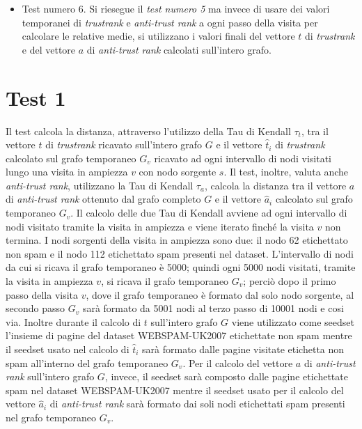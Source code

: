 \begin{itemize}
 \item Test numero 6. Si riesegue il \textit{test numero 5} ma invece di usare dei valori temporanei di \textit{trustrank} e \textit{anti-trust rank} a ogni passo della visita per calcolare le relative medie, si utilizzano i valori finali del vettore \(t\) di \textit{trustrank} e del vettore  \(a\) di \textit{anti-trust rank} calcolati sull'intero grafo.
 \end{itemize}
 
\section{Test 1}
 Il test calcola la distanza, attraverso l'utilizzo  della Tau di Kendall \(\tau_t\), tra il vettore \(t\) di \textit{trustrank} ricavato sull'intero grafo \(G\) e il vettore \(\hat{t}_i\) di \textit{trustrank} calcolato sul grafo temporaneo \(G_v\) ricavato ad ogni intervallo di nodi visitati lungo una visita in ampiezza \(v\) con nodo sorgente \(s\). Il test, inoltre, valuta anche \textit{anti-trust rank}, utilizzano  la Tau di Kendall \(\tau_a\), calcola la distanza  tra il vettore \(a\) di \textit{anti-trust rank} ottenuto dal grafo completo \(G\) e il vettore \(\hat{a}_i\)  calcolato sul grafo temporaneo \(G_v\). Il calcolo delle due Tau di Kendall avviene ad ogni intervallo di nodi visitato tramite la visita in ampiezza e viene iterato finché la visita \(v\) non termina.
 I nodi sorgenti della visita in ampiezza sono due: il nodo 62 etichettato non spam e il nodo 112 etichettato spam presenti nel dataset. L'intervallo di nodi da cui si ricava il grafo temporaneo è 5000; quindi ogni 5000 nodi visitati, tramite la visita in ampiezza \(v\), si ricava il grafo temporaneo \(G_v\); perciò dopo il primo passo della visita \(v\), dove il grafo temporaneo è formato dal solo nodo sorgente, al secondo passo \(G_v\) sarà formato da 5001 nodi al terzo passo di 10001 nodi e cosi via. Inoltre durante il calcolo di \(t\) sull'intero grafo \(G\) viene utilizzato come seedset l'insieme di pagine del dataset WEBSPAM-UK2007 etichettate  non spam mentre il seedset usato nel calcolo di \(\hat{t}_i\)  sarà formato dalle pagine visitate etichetta non spam all'interno del grafo temporaneo \(G_v\). Per il calcolo del vettore \(a\) di \textit{anti-trust rank} sull'intero grafo \(G\), invece, il seedset sarà composto dalle pagine etichettate spam nel dataset WEBSPAM-UK2007 mentre il seedset usato per 
il 
calcolo del vettore \(\hat{a}_i\) di \textit{anti-trust rank} sarà formato dai soli nodi  etichettati spam presenti nel grafo temporaneo \(G_v\).

